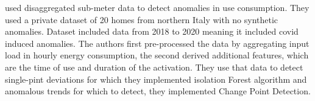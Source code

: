 \cite{Castangia2021} used disaggregated sub-meter data to detect anomalies in use consumption.
They used a private dataset of 20 homes from northern Italy with no synthetic anomalies. 
Dataset included data from 2018 to 2020 meaning it included covid induced anomalies. 
The authors first pre-processed the data by aggregating input load in hourly energy consumption, 
the second derived additional features, which are the time of use and duration of the activation.
They use that data to detect single-pint deviations for which they implemented isolation Forest algorithm and
anomalous trends for which to detect, they implemented Change Point Detection. 
